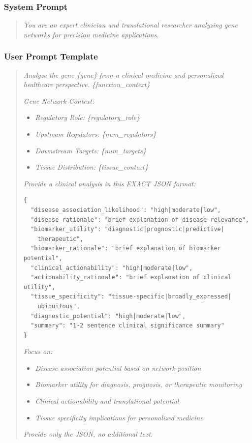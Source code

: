 \documentclass[11pt]{article}
\begin{document}
\subsubsection{System Prompt}

\begin{quote}
\textit{You are an expert clinician and translational researcher analyzing gene networks for precision medicine applications.}
\end{quote}

\subsubsection{User Prompt Template}

\begin{quote}
\textit{Analyze the gene \{gene\} from a clinical medicine and personalized healthcare perspective. \{function\_context\}}

\textit{Gene Network Context:}
\begin{itemize}
\item \textit{Regulatory Role: \{regulatory\_role\}}
\item \textit{Upstream Regulators: \{num\_regulators\}}
\item \textit{Downstream Targets: \{num\_targets\}}
\item \textit{Tissue Distribution: \{tissue\_context\}}
\end{itemize}

\textit{Provide a clinical analysis in this EXACT JSON format:}

\begin{verbatim}
{
  "disease_association_likelihood": "high|moderate|low",
  "disease_rationale": "brief explanation of disease relevance",
  "biomarker_utility": "diagnostic|prognostic|predictive|
    therapeutic",
  "biomarker_rationale": "brief explanation of biomarker potential",
  "clinical_actionability": "high|moderate|low",
  "actionability_rationale": "brief explanation of clinical utility",
  "tissue_specificity": "tissue-specific|broadly_expressed|
    ubiquitous",
  "diagnostic_potential": "high|moderate|low",
  "summary": "1-2 sentence clinical significance summary"
}
\end{verbatim}

\textit{Focus on:}
\begin{itemize}
\item \textit{Disease association potential based on network position}
\item \textit{Biomarker utility for diagnosis, prognosis, or therapeutic monitoring}
\item \textit{Clinical actionability and translational potential}
\item \textit{Tissue specificity implications for personalized medicine}
\end{itemize}

\textit{Provide only the JSON, no additional text.}
\end{quote}
\end{document}
